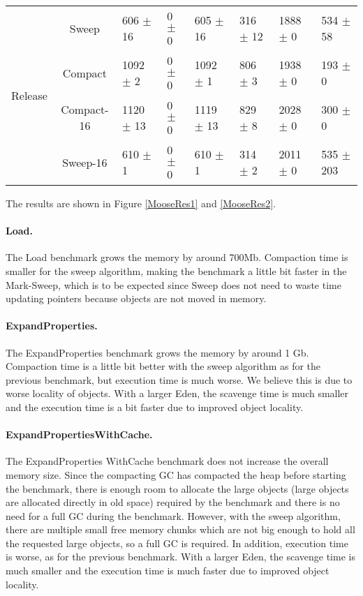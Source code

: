 \documentclass[10pt, sigplan]{acmart}
\begin{document}
\begin{figure*}[thb]
\begin{tabular}{|c|c|l|l|l|l|l|l|}
   \hline
   \multirow{4}{*}{Release} 	& Sweep 		& 606 $\pm$ 16 		&	0 $\pm$ 0 	& 605 $\pm$ 16 	&316 $\pm$ 12 		& 1888 $\pm$ 0 		& 534 $\pm$ 58 \\
    				    		& Compact 	& 1092 $\pm$ 2 		&	0 $\pm$ 0 	& 1092 $\pm$ 1 	&806 $\pm$ 3 			& 1938 $\pm$ 0 		& 193 $\pm$ 0 \\
    				    & Compact-16 	& 1120 $\pm$ 13 		&	0 $\pm$ 0 		& 1119 $\pm$ 13 	&829 $\pm$ 8 			& 2028 $\pm$ 0 		& 300 $\pm$ 0 \\
    				    & Sweep-16 		& 610 $\pm$ 1 			&	0 $\pm$ 0 		& 610 $\pm$ 1 		&314 $\pm$ 2 			& 2011 $\pm$ 0 		& 535 $\pm$ 203 \\
   \hline
\end{tabular} 
\caption{Moose benchmark results with standard errors.} \label{MooseRes2}
\end{figure*}

The results are shown in Figure \ref{MooseRes1} and \ref{MooseRes2}. 

\paragraph{Load.} The Load benchmark grows the memory by around 700Mb. Compaction time is smaller for the sweep algorithm, making the benchmark a little bit faster in the Mark-Sweep, which is to be expected since Sweep does not need to waste time updating pointers because objects are not moved in memory.

\paragraph{ExpandProperties.} The ExpandProperties benchmark grows the memory by around 1 Gb. Compaction time is a little bit better with the sweep algorithm as for the previous benchmark, but execution time is much worse. We believe this is due to worse locality of objects. With a larger Eden, the scavenge time is much smaller and the execution time is a bit faster due to improved object locality.

\paragraph{ExpandPropertiesWithCache.} The ExpandProperties WithCache benchmark does not increase the overall memory size. Since the compacting GC has compacted the heap before starting the benchmark, there is enough room to allocate the large objects (large objects are allocated directly in old space) required by the benchmark and there is no need for a full GC during the benchmark. However, with the sweep algorithm, there are multiple small free memory chunks which are not big enough to hold all the requested large objects, so a full GC is required. In addition, execution time is worse, as for the previous benchmark. With a larger Eden, the scavenge time is much smaller and the execution time is much faster due to improved object locality.
\end{document}
